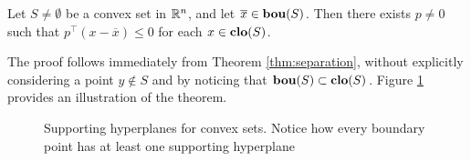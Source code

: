 \begin{theorem}
	Let $S \neq \emptyset$ be a convex set in $\mathbb{R}^n$, and let $\overline{x} \in \mathop{\bf bou}(S)$. Then there exists $p \neq 0$ such that $p^\top(x - \overline{x}) \leq 0$ for each $x \in \mathop{\bf clo}(S)$.
\end{theorem}

The proof follows immediately from Theorem \ref{thm:separation}, without explicitly considering a point $y \notin S$ and by noticing that $\mathop{\bf bou}(S) \subset \mathop{\bf clo}(S)$. Figure \ref{fig:support_convex} provides an illustration of the theorem. 

\begin{figure}[H]
	\caption{Supporting hyperplanes for convex sets. Notice how every boundary point has at least one supporting hyperplane} \label{fig:support_convex}
\end{figure}

